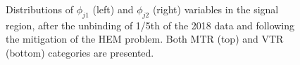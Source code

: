 \begin{figure}[htbp]
{    }
  \caption{Distributions of $\phi_{j1}$ (left) and $\phi_{j2}$ (right) variables in the signal region, after the unbinding of 1/5th of the 2018 data and following the mitigation of the HEM problem. Both MTR (top) and VTR (bottom) categories are presented.}
  \label{fig:jet_phi_postHEM}
\end{figure}